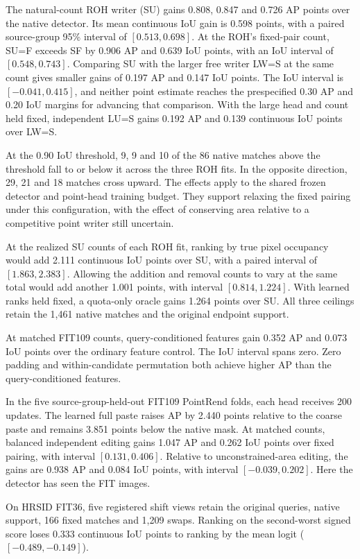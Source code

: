 \documentclass[journal]{IEEEtran}
\begin{document}
The natural-count ROH writer (SU) gains 0.808, 0.847 and 0.726 AP points over the native detector. Its mean continuous IoU gain is 0.598 points, with a paired source-group 95\% interval of \([0.513,0.698]\). At the ROH's fixed-pair count, SU=F exceeds SF by 0.906 AP and 0.639 IoU points, with an IoU interval of \([0.548,0.743]\). Comparing SU with the larger free writer LW=S at the same count gives smaller gains of 0.197 AP and 0.147 IoU points. The IoU interval is \([-0.041,0.415]\), and neither point estimate reaches the prespecified 0.30 AP and 0.20 IoU margins for advancing that comparison. With the large head and count held fixed, independent LU=S gains 0.192 AP and 0.139 continuous IoU points over LW=S.

At the 0.90 IoU threshold, 9, 9 and 10 of the 86 native matches above the threshold fall to or below it across the three ROH fits. In the opposite direction, 29, 21 and 18 matches cross upward. The effects apply to the shared frozen detector and point-head training budget. They support relaxing the fixed pairing under this configuration, with the effect of conserving area relative to a competitive point writer still uncertain.

At the realized SU counts of each ROH fit, ranking by true pixel occupancy would add 2.111 continuous IoU points over SU, with a paired interval of \([1.863,2.383]\). Allowing the addition and removal counts to vary at the same total would add another 1.001 points, with interval \([0.814,1.224]\). With learned ranks held fixed, a quota-only oracle gains 1.264 points over SU. All three ceilings retain the 1,461 native matches and the original endpoint support.

At matched FIT109 counts, query-conditioned features gain 0.352 AP and 0.073 IoU points over the ordinary feature control. The IoU interval spans zero. Zero padding and within-candidate permutation both achieve higher AP than the query-conditioned features.

In the five source-group-held-out FIT109 PointRend folds, each head receives 200 updates. The learned full paste raises AP by 2.440 points relative to the coarse paste and remains 3.851 points below the native mask. At matched counts, balanced independent editing gains 1.047 AP and 0.262 IoU points over fixed pairing, with interval \([0.131,0.406]\). Relative to unconstrained-area editing, the gains are 0.938 AP and 0.084 IoU points, with interval \([-0.039,0.202]\). Here the detector has seen the FIT images.

On HRSID FIT36, five registered shift views retain the original queries, native support, 166 fixed matches and 1,209 swaps. Ranking on the second-worst signed score loses 0.333 continuous IoU points to ranking by the mean logit (\([-0.489,-0.149]\)).
\end{document}
